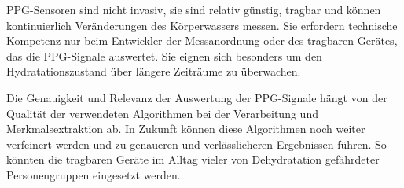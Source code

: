 \documentclass[10pt,a4paper,headinclude,twoside, plainheadsepline, open=right, numbers=noenddot, twocolumn]{article}
\begin{document}
PPG-Sensoren sind nicht invasiv, sie sind relativ günstig, tragbar und können kontinuierlich Veränderungen des Körperwassers messen.
Sie erfordern technische Kompetenz nur beim Entwickler der Messanordnung oder des tragbaren Gerätes, das die PPG-Signale auswertet. 
Sie eignen sich besonders um den Hydratationszustand über längere Zeiträume zu überwachen. 

Die Genauigkeit und Relevanz der Auswertung der PPG-Signale hängt von der Qualität der verwendeten Algorithmen bei der Verarbeitung und Merkmalsextraktion ab.
In Zukunft können diese Algorithmen noch weiter verfeinert werden und zu genaueren und verlässlicheren Ergebnissen führen.
So könnten die tragbaren Geräte im Alltag vieler von Dehydratation gefährdeter Personengruppen eingesetzt werden.



%
\printbibliography
\end{document}
